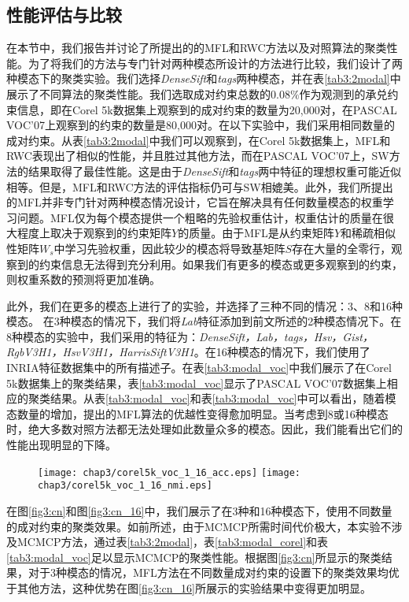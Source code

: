 \subsection{性能评估与比较}
在本节中，我们报告并讨论了所提出的的MFL和RWC方法以及对照算法的聚类性能。为了将我们的方法与专门针对两种模态所设计的方法进行比较，我们设计了两种模态下的聚类实验。我们选择\textit{DenseSift}和\textit{tags}两种模态，并在表\ref{tab3:2modal}中展示了不同算法的聚类性能。我们选取成对约束总数的$0.08\%$作为观测到的承兑约束信息，即在Corel 5k数据集上观察到的成对约束的数量为20,000对，在PASCAL VOC'07上观察到的约束的数量是80,000对。在以下实验中，我们采用相同数量的成对约束。从表\ref{tab3:2modal}中我们可以观察到，在Corel 5k数据集上，MFL和RWC表现出了相似的性能，并且胜过其他方法，而在PASCAL VOC'07上，SW方法的结果取得了最佳性能。这是由于\textit{DenseSift}和\textit{tags}两中特征的理想权重可能近似相等。但是，MFL和RWC方法的评估指标仍可与SW相媲美。此外，我们所提出的MFL并非专门针对两种模态情况设计，它旨在解决具有任何数量模态的权重学习问题。MFL仅为每个模态提供一个粗略的先验权重估计，权重估计的质量在很大程度上取决于观察到的约束矩阵$ {Y} $的质量。由于MFL是从约束矩阵$ {Y} $和稀疏相似性矩阵${W}_s $中学习先验权重，因此较少的模态将导致基矩阵$ {S} $存在大量的全零行，观察到的约束信息无法得到充分利用。如果我们有更多的模态或更多观察到的约束，则权重系数的预测将更加准确。

此外，我们在更多的模态上进行了的实验，并选择了三种不同的情况：3、8和16种模态。 在3种模态的情况下，我们将\textit{Lab}特征添加到前文所述的2种模态情况下。在8种模态的实验中，我们采用的特征为：\textit{DenseSift，Lab，tags，Hsv，Gist，RgbV3H1，HsvV3H1，HarrisSiftV3H1}。在16种模态的情况下，我们使用了INRIA特征数据集中的所有描述子。在表\ref{tab3:modal_voc}中我们展示了在Corel 5k数据集上的聚类结果，表\ref{tab3:modal_voc}显示了PASCAL VOC'07数据集上相应的聚类结果。从表\ref{tab3:modal_voc}和表\ref{tab3:modal_voc}中可以看出，随着模态数量的增加，提出的MFL算法的优越性变得愈加明显。当考虑到8或16种模态时，绝大多数对照方法都无法处理如此数量众多的模态。因此，我们能看出它们的性能出现明显的下降。

\begin{figure}[t]
    \centering
    \texttt{[image: chap3/corel5k\_voc\_1\_16\_acc.eps]}
    \texttt{[image: chap3/corel5k\_voc\_1\_16\_nmi.eps]}
	\label{fig3:1_16}
\end{figure} 

在图\ref{fig3:cn}和图\ref{fig3:cn_16}中，我们展示了在3种和16种模态下，使用不同数量的成对约束的聚类效果。如前所述，由于MCMCP所需时间代价极大，本实验不涉及MCMCP方法，通过表\ref{tab3:2modal}，表\ref{tab3:modal_corel}和表\ref{tab3:modal_voc}足以显示MCMCP的聚类性能。根据图\ref{fig3:cn}所显示的聚类结果，对于3种模态的情况，MFL方法在不同数量成对约束的设置下的聚类效果均优于其他方法，这种优势在图\ref{fig3:cn_16}所展示的实验结果中变得更加明显。



